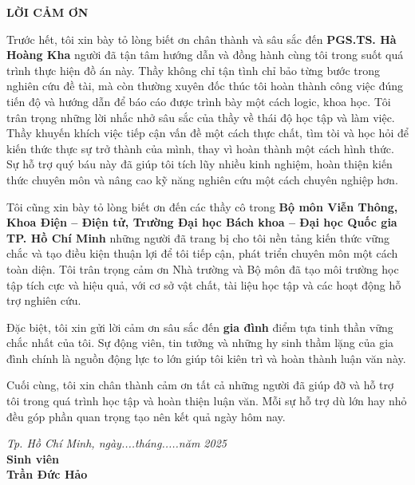 \thispagestyle{empty}
\begin{center}
    \vspace*{1.5cm}
    \textbf{\fontsize{16}{19}\selectfont LỜI CẢM ƠN}
    \vspace{0.8cm}
\end{center}

\noindent
\setlength{\parindent}{1.5cm}
\setlength{\parskip}{6pt}
\fontsize{12}{14}\selectfont  

Trước hết, tôi xin bày tỏ lòng biết ơn chân thành và sâu sắc đến \textbf{PGS.TS. Hà Hoàng Kha} người đã tận tâm hướng dẫn và đồng hành cùng tôi trong suốt quá trình thực hiện đồ án này. Thầy không chỉ tận tình chỉ bảo từng bước trong nghiên cứu đề tài, mà còn thường xuyên đốc thúc tôi hoàn thành công việc đúng tiến độ và hướng dẫn để báo cáo được trình bày một cách logic, khoa học. Tôi trân trọng những lời nhắc nhở sâu sắc của thầy về thái độ học tập và làm việc. Thầy khuyến khích việc tiếp cận vấn đề một cách thực chất, tìm tòi và học hỏi để kiến thức thực sự trở thành của mình, thay vì hoàn thành một cách hình thức. Sự hỗ trợ quý báu này đã giúp tôi tích lũy nhiều kinh nghiệm, hoàn thiện kiến thức chuyên môn và nâng cao kỹ năng nghiên cứu một cách chuyên nghiệp hơn.

Tôi cũng xin bày tỏ lòng biết ơn đến các thầy cô trong \textbf{Bộ môn Viễn Thông, Khoa Điện – Điện tử, Trường Đại học Bách khoa – Đại học Quốc gia TP. Hồ Chí Minh} những người đã trang bị cho tôi nền tảng kiến thức vững chắc và tạo điều kiện thuận lợi để tôi tiếp cận, phát triển chuyên môn một cách toàn diện. Tôi trân trọng cảm ơn Nhà trường và Bộ môn đã tạo môi trường học tập tích cực và hiệu quả, với cơ sở vật chất, tài liệu học tập và các hoạt động hỗ trợ nghiên cứu.

Đặc biệt, tôi xin gửi lời cảm ơn sâu sắc đến \textbf{gia đình} điểm tựa tinh thần vững chắc nhất của tôi. Sự động viên, tin tưởng và những hy sinh thầm lặng của gia đình chính là nguồn động lực to lớn giúp tôi kiên trì và hoàn thành luận văn này.

Cuối cùng, tôi xin chân thành cảm ơn tất cả những người đã giúp đỡ và hỗ trợ tôi trong quá trình học tập và hoàn thiện luận văn. Mỗi sự hỗ trợ dù lớn hay nhỏ đều góp phần quan trọng tạo nên kết quả ngày hôm nay.

\vspace{0.8cm}
\begin{flushright}
    \begin{minipage}{0.5\textwidth}
        \centering
        \textit{Tp. Hồ Chí Minh, ngày....tháng.....năm 2025} \\
        \vspace{0.8cm}
        \textbf{Sinh viên} \\
        \vspace{0.3cm}
        \textbf{Trần Đức Hảo}
    \end{minipage}
\end{flushright}

\vfill
\clearpage
